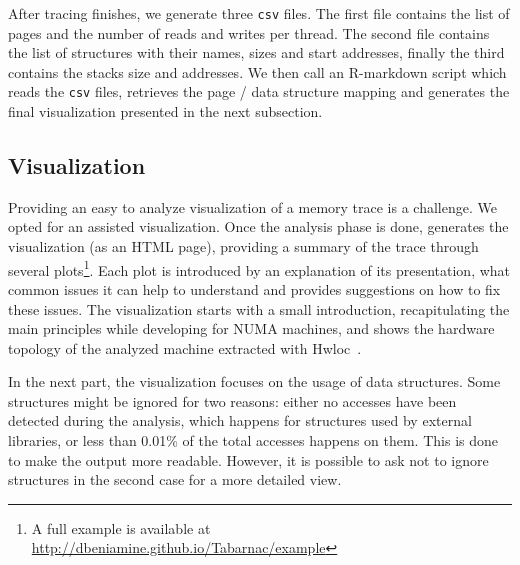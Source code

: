After tracing finishes, we generate three \texttt{csv} files.  The first file
contains the list of pages and the number of reads and writes per thread. The
second file contains the list of structures with their names, sizes and start
addresses, finally the third contains the stacks size and addresses.
We then call an R-markdown script which reads the \texttt{csv} files,
retrieves the page / data structure mapping and generates the final
visualization presented in the next subsection.


\subsection{Visualization}
\label{sec:design-visu}

Providing an easy to analyze visualization of a memory trace is a challenge. We
opted for an assisted visualization. Once the analysis phase is done,
\TABARNAC generates the visualization (as an HTML page), providing a summary
of the trace through several plots\footnote{A full example is available at
    \url{http://dbeniamine.github.io/Tabarnac/example}}. Each plot is introduced by an explanation
of its presentation, what common issues it can help to understand and provides
suggestions on how to fix these issues.  The visualization starts with a small
introduction, recapitulating the main principles while developing for NUMA
machines, and shows the hardware topology of the analyzed machine extracted
with Hwloc~\cite{Broquedis10hwloc}.

In the next part, the visualization focuses on the usage of data structures. Some
structures might be ignored for two reasons: either no accesses have been
detected during the analysis, which happens for structures used by external
libraries, or less than 0.01\% of the total accesses happens on them. This is
done to make the output more readable. However, it is possible to ask
\TABARNAC not to ignore structures in the second case for a more detailed view.


